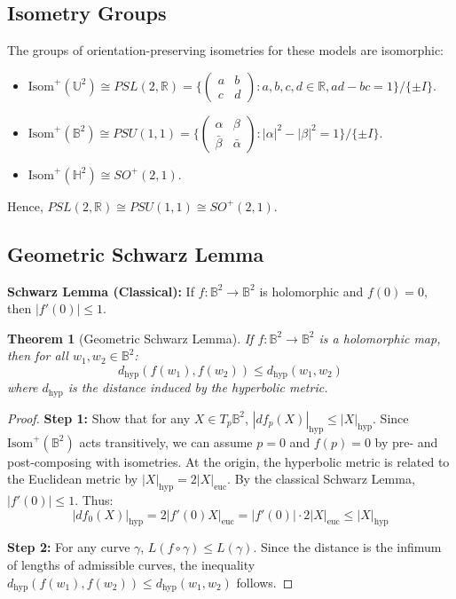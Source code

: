 \documentclass[11pt, a4paper]{article}
\theoremstyle{plain}
\newtheorem{theorem}{Theorem}[section]
\theoremstyle{definition}
\theoremstyle{remark}
\begin{document}
\subsection{Isometry Groups}

The groups of orientation-preserving isometries for these models are isomorphic:
\begin{itemize}
    \item $\text{Isom}^+(\mathbb{U}^2) \cong PSL(2, \mathbb{R}) = \{ \begin{pmatrix} a & b \\ c & d \end{pmatrix} : a,b,c,d \in \mathbb{R}, ad-bc=1 \} / \{\pm I\}$.
    \item $\text{Isom}^+(\mathbb{B}^2) \cong PSU(1, 1) = \{ \begin{pmatrix} \alpha & \beta \\ \bar{\beta} & \bar{\alpha} \end{pmatrix} : |\alpha|^2 - |\beta|^2 = 1 \} / \{\pm I\}$.
    \item $\text{Isom}^+(\mathbb{H}^2) \cong SO^+(2, 1)$.
\end{itemize}
Hence, $PSL(2, \mathbb{R}) \cong PSU(1, 1) \cong SO^+(2, 1)$.

\subsection{Geometric Schwarz Lemma}

\textbf{Schwarz Lemma (Classical):} If $f: \mathbb{B}^2 \to \mathbb{B}^2$ is holomorphic and $f(0)=0$, then $|f'(0)| \le 1$.

\begin{theorem}[Geometric Schwarz Lemma]
If $f: \mathbb{B}^2 \to \mathbb{B}^2$ is a holomorphic map, then for all $w_1, w_2 \in \mathbb{B}^2$:
\[ d_{\text{hyp}}(f(w_1), f(w_2)) \le d_{\text{hyp}}(w_1, w_2) \]
where $d_{\text{hyp}}$ is the distance induced by the hyperbolic metric.
\end{theorem}

\begin{proof}
\textbf{Step 1:} Show that for any $X \in T_p \mathbb{B}^2$, $|df_p(X)|_{\text{hyp}} \le |X|_{\text{hyp}}$.
Since $\text{Isom}^+(\mathbb{B}^2)$ acts transitively, we can assume $p=0$ and $f(p)=0$ by pre- and post-composing with isometries. At the origin, the hyperbolic metric is related to the Euclidean metric by $|X|_{\text{hyp}} = 2|X|_{\text{euc}}$. By the classical Schwarz Lemma, $|f'(0)| \le 1$. Thus:
\[ |df_0(X)|_{\text{hyp}} = 2|f'(0)X|_{\text{euc}} = |f'(0)| \cdot 2|X|_{\text{euc}} \le |X|_{\text{hyp}} \]

\textbf{Step 2:} For any curve $\gamma$, $L(f \circ \gamma) \le L(\gamma)$. Since the distance is the infimum of lengths of admissible curves, the inequality $d_{\text{hyp}}(f(w_1), f(w_2)) \le d_{\text{hyp}}(w_1, w_2)$ follows.
\end{proof}
\end{document}
